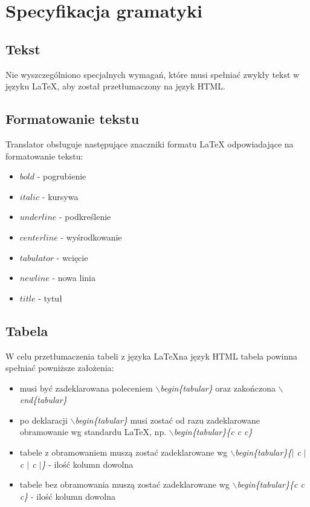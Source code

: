 \chapter{Specyfikacja gramatyki}

\section{Tekst}
Nie wyszczególniono specjalnych wymagań, które musi spełniać zwykły tekst w języku \LaTeX \space, 
aby został przetłumaczony na język HTML.

\section{Formatowanie tekstu}

Translator obsługuje następujące znaczniki formatu LaTeX odpowiadające na formatowanie tekstu:
\begin{itemize}
    \item \textit{$bold$} - pogrubienie
    \item \textit{$italic$} - kursywa
    \item \textit{$underline$} - podkreślenie
    \item \textit{$centerline$} - wyśrodkowanie
    \item \textit{$tabulator$} - wcięcie
    \item \textit{$newline$} - nowa linia
    \item \textit{$title$} - tytuł
\end{itemize}

\section{Tabela}
W celu przetłumaczenia tabeli z języka \LaTeX \space na język HTML tabela powinna spełniać powniższe założenia: 
\begin{itemize}
    \item musi być zadeklarowana poleceniem \textit{$\backslash$begin\{tabular\}} oraz zakończona \textit{$\backslash$end\{tabular\}}
    \item po deklaracji \textit{$\backslash$begin\{tabular\}} musi zostać od razu zadeklarowane obramowanie wg standardu \LaTeX \space,
    np. \textit{$\backslash$begin\{tabular\}\{c c c\}}
    \item tabele z obramowaniem muszą zostać zadeklarowane wg \textit{$\backslash$begin\{tabular\}\{$|$ c $|$ c $|$ c $|$\}} - ilość kolumn dowolna
    \item tabele bez obramowania muszą zostać zadeklarowane wg \textit{$\backslash$begin\{tabular\}\{c c c\}}  - ilość kolumn dowolna
\end{itemize}

